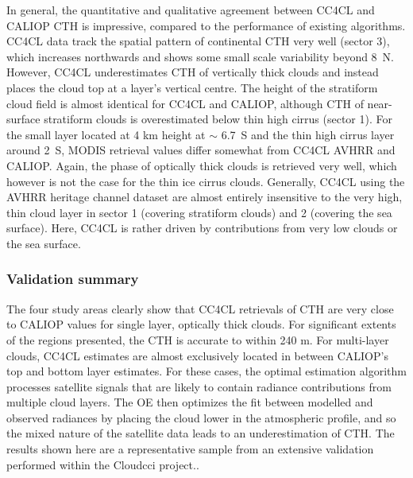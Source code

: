 In general, the quantitative and qualitative agreement between CC4CL and CALIOP CTH is impressive, compared to the performance of existing algorithms. CC4CL data track the spatial pattern of continental CTH very well (sector 3), which increases northwards and shows some small scale variability beyond 8\textdegree\ N. However, CC4CL underestimates CTH of vertically thick clouds and instead places the cloud top at a layer's vertical centre. The height of the stratiform cloud field is almost identical for CC4CL and CALIOP, although CTH of near-surface stratiform clouds is overestimated below thin high cirrus (sector 1). For the small layer located at 4 km height at $\sim$ 6.7\textdegree\ S and the thin high cirrus layer around 2\textdegree\ S, MODIS retrieval values differ somewhat from CC4CL AVHRR and CALIOP. Again, the phase of optically thick clouds is retrieved very well, which however is not the case for the thin ice cirrus clouds. Generally, CC4CL using the AVHRR heritage channel dataset are almost entirely insensitive to the very high, thin cloud layer in sector 1 (covering stratiform clouds) and 2 (covering the sea surface). Here, CC4CL is rather driven by contributions from very low clouds or the sea surface. 

\subsubsection{Validation summary}

The four study areas clearly show that CC4CL retrievals of CTH are very close to CALIOP values for single layer, optically thick clouds. For significant extents of the regions presented, the CTH is accurate to within 240 m. For multi-layer clouds, CC4CL estimates are almost exclusively located in between CALIOP's top and bottom layer estimates. For these cases, the optimal estimation algorithm processes satellite signals that are likely to contain radiance contributions from multiple cloud layers. The OE then optimizes the fit between modelled and observed radiances by placing the cloud lower in the atmospheric profile, and so the mixed nature of the satellite data leads to an underestimation of CTH. The results shown here are a representative sample from an extensive validation performed within the Cloud\textunderscore cci project..%

